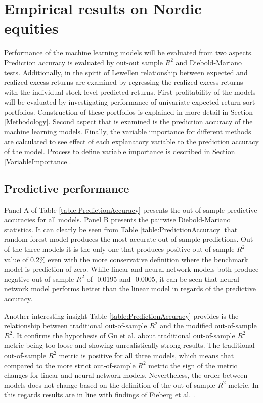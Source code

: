 \documentclass{article}
\begin{document}
\section{Empirical results on Nordic equities}

Performance of the machine learning models will be evaluated from two aspects. Prediction accuracy is evaluated by out-out sample $R^2$ and Diebold-Mariano tests. Additionally, in the spirit of Lewellen \citeyear{Lewellen2015} relationship between expected and realized excess returns are examined by regressing the realized excess returns with the individual stock level predicted returns. First profitability of the models will be evaluated by investigating performance of univariate expected return sort portfolios. Construction of these portfolios is explained in more detail in Section \ref{Methodology}. Second aspect that is examined is the prediction accuracy of the machine learning models.  Finally, the variable importance for different methods are calculated to see effect of each explanatory variable to the prediction accuracy of the model. Process to define variable importance is described in Section \ref{VariableImportance}. \par

\subsection{Predictive performance}\label{PredictivePerformance}

Panel A of Table \ref{table:PredictionAccuracy} presents the out-of-sample predictive accuracies for all models. Panel B presents the pairwise Diebold-Mariano statistics. It can clearly be seen from Table \ref{table:PredictionAccuracy} that random forest model produces the most accurate out-of-sample predictions. Out of the three models it is the only one that produces positive out-of-sample $R^2$ value of 0.2\% even with the more conservative definition where the benchmark model is prediction of zero. While linear and neural network models both produce negative out-of-sample $R^2$ of -0.0195 and -0.0005, it can be seen that neural network model performs better than the linear model in regards of the predictive accuracy. \par

Another interesting insight Table \ref{table:PredictionAccuracy} provides is the relationship between traditional out-of-sample $R^2$ and the modified out-of-sample $R^2$. It confirms the hypothesis of Gu et al. \citeyear{guetal} about traditional out-of-sample $R^2$ metric being too loose and showing unrealistically strong results. The  traditional out-of-sample $R^2$ metric is positive for all three models, which means that compared to the more strict out-of-sample $R^2$ metric the sign of the metric changes for linear and neural network models. Nevertheless, the order between models does not change based on the definition of the out-of-sample $R^2$ metric. In this regards results are in line with findings of Fieberg et al. \citeyear{Fieberg}. \par
\end{document}
